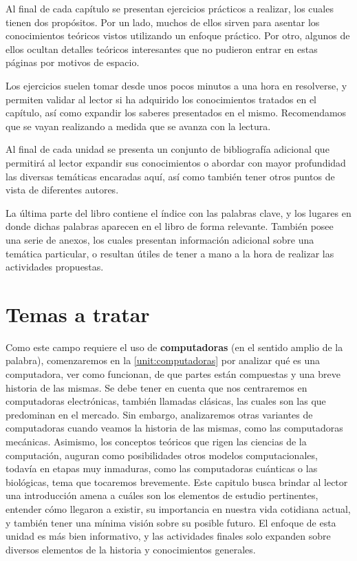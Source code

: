 Al final de cada capítulo se presentan ejercicios prácticos a realizar, los
cuales tienen dos propósitos. Por un lado, muchos de ellos sirven para asentar
los conocimientos teóricos vistos utilizando un enfoque práctico. Por otro,
algunos de ellos ocultan detalles teóricos interesantes que no pudieron entrar
en estas páginas por motivos de espacio.

Los ejercicios suelen tomar desde unos pocos minutos a una hora en resolverse, y
permiten validar al lector si ha adquirido los conocimientos tratados en el
capítulo, así como expandir los saberes presentados en el mismo. Recomendamos
que se vayan realizando a medida que se avanza con la lectura.

Al final de cada unidad se presenta un conjunto de bibliografía adicional que
permitirá al lector expandir sus conocimientos o abordar con mayor profundidad
las diversas temáticas encaradas aquí, así como también tener otros puntos de
vista de diferentes autores.

La última parte del libro contiene el índice con las palabras clave, y los
lugares en donde dichas palabras aparecen en el libro de forma relevante.
También posee una serie de anexos, los cuales presentan información adicional
sobre una temática particular, o resultan útiles de tener a mano a la hora de
realizar las actividades propuestas.

\section*{Temas a tratar}

Como este campo requiere el uso de \textbf{computadoras} (en el sentido amplio
de la palabra), comenzaremos en la \autoref{unit:computadoras} por analizar qué
es una computadora, ver como funcionan, de que partes están compuestas y una
breve historia de las mismas. Se debe tener en cuenta que nos centraremos en
computadoras electrónicas, también llamadas clásicas, las cuales son las que
predominan en el mercado. Sin embargo, analizaremos otras variantes de
computadoras cuando veamos la historia de las mismas, como las computadoras
mecánicas. Asimismo, los conceptos teóricos que rigen las ciencias de la
computación, auguran como posibilidades otros modelos computacionales, todavía
en etapas muy inmaduras, como las computadoras cuánticas o las biológicas, tema
que tocaremos brevemente. Este capitulo busca brindar al lector una introducción
amena a cuáles son los elementos de estudio pertinentes, entender cómo llegaron
a existir, su importancia en nuestra vida cotidiana actual, y también tener una
mínima visión sobre su posible futuro. El enfoque de esta unidad es más bien
informativo, y las actividades finales solo expanden sobre diversos elementos de
la historia y conocimientos generales.

